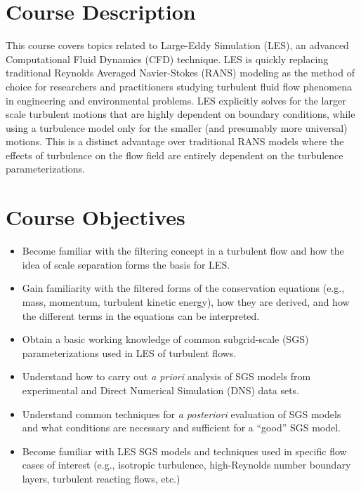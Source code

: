 \documentclass[11pt]{article}
\theoremstyle{mytheor}
\begin{document}
\section*{Course Description}
This course covers topics related to Large-Eddy Simulation (LES), an advanced Computational Fluid Dynamics (CFD) technique. LES is quickly replacing traditional Reynolds Averaged Navier-Stokes (RANS) modeling as the method of choice for researchers and practitioners studying turbulent fluid flow phenomena in engineering and environmental problems. LES explicitly solves for the larger scale turbulent motions that are highly dependent on boundary conditions, while using a turbulence model only for the smaller (and presumably more universal) motions. This is a distinct advantage over traditional RANS models where the effects of turbulence on the flow field are entirely dependent on the turbulence parameterizations.


\section*{Course Objectives}
\begin{itemize}
\item Become familiar with the filtering concept in a turbulent flow and how the idea of scale separation forms the basis for LES.
\item Gain familiarity with the filtered forms of the conservation equations (e.g., mass, momentum, turbulent kinetic energy), how they are derived, and how the different terms in the equations can be interpreted.
\item Obtain a basic working knowledge of common subgrid-scale (SGS) parameterizations used in LES of turbulent flows.
\item Understand how to carry out \textit{a priori} analysis of SGS models from experimental and Direct Numerical Simulation (DNS) data sets.
\item Understand common techniques for \textit{a posteriori} evaluation of SGS models and what conditions are necessary and sufficient for a ``good'' SGS model.
\item Become familiar with LES SGS models and techniques used in specific flow cases of interest (e.g., isotropic turbulence, high-Reynolds number boundary layers,  turbulent reacting flows, etc.)
\end{itemize}
\end{document}
